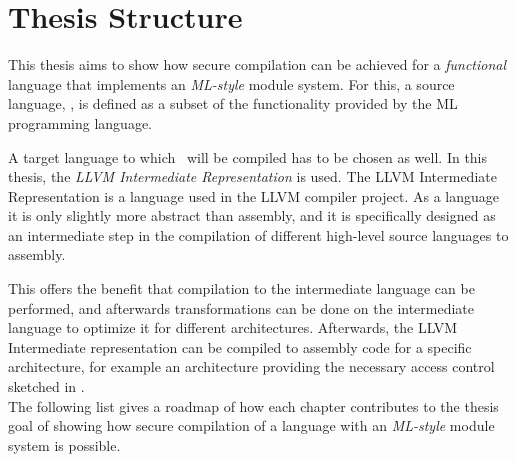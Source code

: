 \section{Thesis Structure}
This thesis aims to show how secure compilation can be achieved for a \emph{functional} language that implements an \emph{ML-style} module system.
For this, a source language, \emph{\MiniML}, is defined as a subset of the functionality provided by the ML programming language.

A target language to which \MiniML\ will be compiled has to be chosen as well.
In this thesis, the \emph{LLVM Intermediate Representation} is used.
The LLVM Intermediate Representation is a language used in the LLVM compiler project.
As a language it is only slightly more abstract than assembly, and it is specifically designed as an intermediate step in the compilation of different high-level source languages to assembly.

This offers the benefit that compilation to the intermediate language can be performed, and afterwards transformations can be done on the intermediate language to optimize it for different architectures.
Afterwards, the LLVM Intermediate representation can be compiled to assembly code for a specific architecture, for example an architecture providing the necessary access control sketched in .
\\[1em]
The following list gives a roadmap of how each chapter contributes to the thesis goal of showing how secure compilation of a language with an \emph{ML-style} module system is possible.

